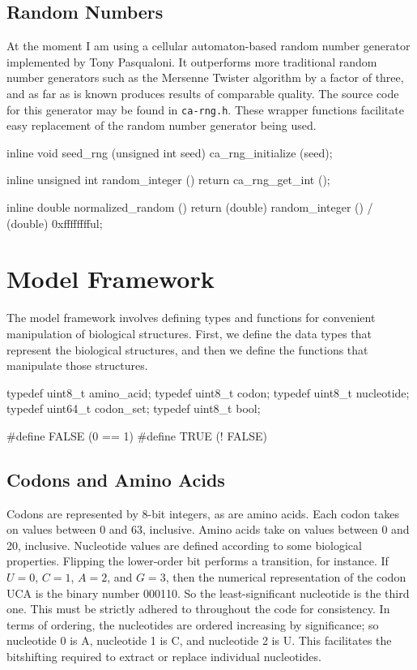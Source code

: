 \documentclass{article}
\begin{document}
    \subsection{Random Numbers}
      \label{sec:random}

      At the moment I am using a cellular automaton-based random number
      generator implemented by Tony Pasqualoni. It outperforms more traditional
      random number generators such as the Mersenne Twister algorithm by a
      factor of three, and as far as is known produces results of comparable
      quality. The source code for this generator may be found in
      \verb|ca-rng.h|. These wrapper functions facilitate easy replacement of
      the random number generator being used.

\begin{ccode}
inline void seed_rng (unsigned int seed)
  {ca_rng_initialize (seed);}

inline unsigned int random_integer ()
  {return ca_rng_get_int ();}

inline double normalized_random ()
  {return (double) random_integer () / (double) 0xfffffffful;}
\end{ccode}

  \section{Model Framework}
    \label{sec:framework}

    The model framework involves defining types and functions for convenient
    manipulation of biological structures. First, we define the data types that
    represent the biological structures, and then we define the functions that
    manipulate those structures.

\begin{ccode}
typedef uint8_t		amino_acid;
typedef uint8_t		codon;
typedef uint8_t		nucleotide;
typedef uint64_t	codon_set;
typedef uint8_t		bool;

#define FALSE (0 == 1)
#define TRUE (! FALSE)
\end{ccode}

    \subsection{Codons and Amino Acids}
      \label{sec:codons-amino-acids}

      Codons are represented by 8-bit integers, as are amino acids. Each codon
      takes on values between 0 and 63, inclusive. Amino acids take on values
      between 0 and 20, inclusive. Nucleotide values are defined according to
      some biological properties. Flipping the lower-order bit performs a
      transition, for instance. If $U = 0$, $C = 1$, $A = 2$, and $G = 3$, then
      the numerical representation of the codon UCA is the binary number 000110.
      So the least-significant nucleotide is the third one. This must be
      strictly adhered to throughout the code for consistency. In terms of
      ordering, the nucleotides are ordered increasing by significance; so
      nucleotide 0 is A, nucleotide 1 is C, and nucleotide 2 is U. This
      facilitates the bitshifting required to extract or replace individual
      nucleotides.
      
\end{document}
